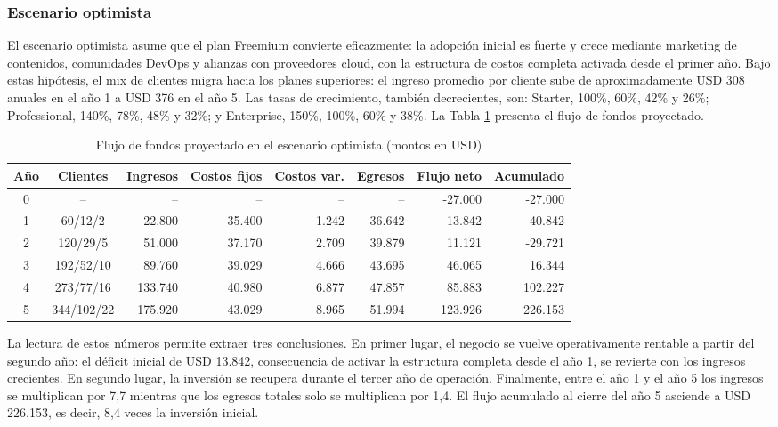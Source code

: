 \subsubsection{Escenario optimista}

El escenario optimista asume que el plan Freemium convierte eficazmente: la adopción inicial es fuerte y crece mediante marketing de contenidos, comunidades DevOps y alianzas con proveedores cloud, con la estructura de costos completa activada desde el primer año. Bajo estas hipótesis, el mix de clientes migra hacia los planes superiores: el ingreso promedio por cliente sube de aproximadamente USD 308 anuales en el año 1 a USD 376 en el año 5. Las tasas de crecimiento, también decrecientes, son: Starter, 100\%, 60\%, 42\% y 26\%; Professional, 140\%, 78\%, 48\% y 32\%; y Enterprise, 150\%, 100\%, 60\% y 38\%. La Tabla \ref{tab:flujo-optimista} presenta el flujo de fondos proyectado.

\begin{table}[H]
\centering
\footnotesize
\begin{tabular}{c c r r r r r r}
\hline
Año & Clientes & Ingresos & Costos fijos & Costos var. & Egresos & Flujo neto & Acumulado \\
\hline
0 & -- & -- & -- & -- & -- & -27.000 & -27.000 \\
1 & 60/12/2 & 22.800 & 35.400 & 1.242 & 36.642 & -13.842 & -40.842 \\
2 & 120/29/5 & 51.000 & 37.170 & 2.709 & 39.879 & 11.121 & -29.721 \\
3 & 192/52/10 & 89.760 & 39.029 & 4.666 & 43.695 & 46.065 & 16.344 \\
4 & 273/77/16 & 133.740 & 40.980 & 6.877 & 47.857 & 85.883 & 102.227 \\
5 & 344/102/22 & 175.920 & 43.029 & 8.965 & 51.994 & 123.926 & 226.153 \\
\hline
\end{tabular}
\caption{Flujo de fondos proyectado en el escenario optimista (montos en USD)}
\label{tab:flujo-optimista}
\end{table}

La lectura de estos números permite extraer tres conclusiones. En primer lugar, el negocio se vuelve operativamente rentable a partir del segundo año: el déficit inicial de USD 13.842, consecuencia de activar la estructura completa desde el año 1, se revierte con los ingresos crecientes. En segundo lugar, la inversión se recupera durante el tercer año de operación. Finalmente, entre el año 1 y el año 5 los ingresos se multiplican por 7,7 mientras que los egresos totales solo se multiplican por 1,4. El flujo acumulado al cierre del año 5 asciende a USD 226.153, es decir, 8,4 veces la inversión inicial.


